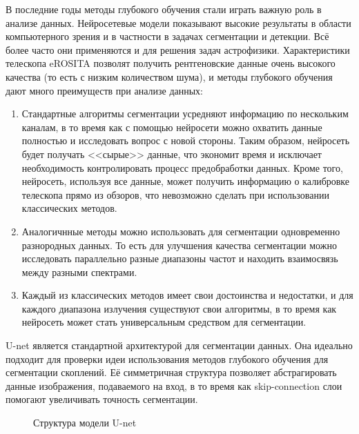 В последние годы методы глубокого обучения стали играть важную роль в анализе данных. Нейросетевые 
модели показывают высокие результаты в области компьютерного зрения и в частности в задачах 
сегментации и детекции. Всё более часто они применяются и для решения задач астрофизики. 
Характеристики телескопа eROSITA позволят получить рентгеновские данные очень высокого качества (то 
есть с низким количеством шума), и методы глубокого обучения дают много преимуществ при анализе 
данных: 

\begin{enumerate}
    \item Стандартные алгоритмы сегментации усредняют информацию по нескольким каналам,
        в то время как с помощью нейросети можно охватить данные полностью и исследовать вопрос с 
        новой стороны. Таким образом, нейросеть будет получать <<сырые>> данные, что экономит время 
        и исключает необходимость контролировать процесс предобработки данных. 
        Кроме того, нейросеть, используя все данные, может получить информацию о 
        калибровке телескопа прямо из обзоров, что невозможно сделать при использовании классических 
        методов.
    \item Аналогичнные методы можно использовать для сегментации одновременно разнородных данных. 
        То есть для улучшения качества сегментации можно исследовать параллельно разные диапазоны 
        частот и находить взаимосвязь между разными спектрами.
    \item Каждый из классических методов имеет свои достоинства и недостатки, и для каждого 
        диапазона излучения существуют свои алгоритмы, в то время как 
        нейросеть может стать универсальным средством для сегментации.
\end{enumerate}

U-net \cite{Unet} является стандартной архитектурой для сегментации данных. Она идеально подходит 
для проверки идеи использования методов глубокого обучения для сегментации скоплений.
Её симметричная структура позволяет абстрагировать данные изображения, подаваемого на 
вход, в то время как skip-connection слои помогают увеличивать точность сегментации.

\begin{figure}[h]
    \caption{Структура модели U-net \cite{Unet}}
\end{figure}


